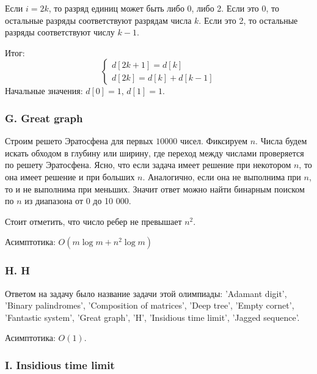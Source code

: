 Если $i = 2 k$, то разряд единиц может быть либо 0, либо 2. Если это 0, то остальные разряды соответствуют разрядам числа $k$. Если это 2, то остальные разряды соответствуют числу $k - 1$.

Итог:
$$
\begin{cases}
d[2 k + 1] = d[k]\\
d[2 k] = d[k] + d[k - 1]
\end{cases}
$$
Начальные значения: $d[0] = 1$, $d[1] = 1$.



\subsubsection*{G. Great graph} 


Строим решето Эратосфена для первых $10 000$ чисел. Фиксируем $n$. Числа будем искать обходом в глубину или ширину, где переход между числами проверяется по решету Эратосфена. Ясно, что если задача имеет решение при некотором $n$, то она имеет решение и при больших $n$. Аналогично, если она не выполнима при $n$, то и не выполнима при меньших. Значит ответ можно найти бинарным поиском по $n$ из диапазона от 0 до 10 000.

Стоит отметить, что число ребер не превышает $n^2$.

Асимптотика: $O( m \log m + n^2 \log m)$ 



\subsubsection*{H. H} 


Ответом на задачу было название задачи этой олимпиады: 'Adamant digit', 'Binary palindromes', 'Composition of matrices', 'Deep tree', 'Empty cornet', 'Fantastic system', 'Great graph', 'H', 'Insidious time limit', 'Jagged sequence'.

Асимптотика: $O(1)$.

\subsubsection*{I. Insidious time limit}


